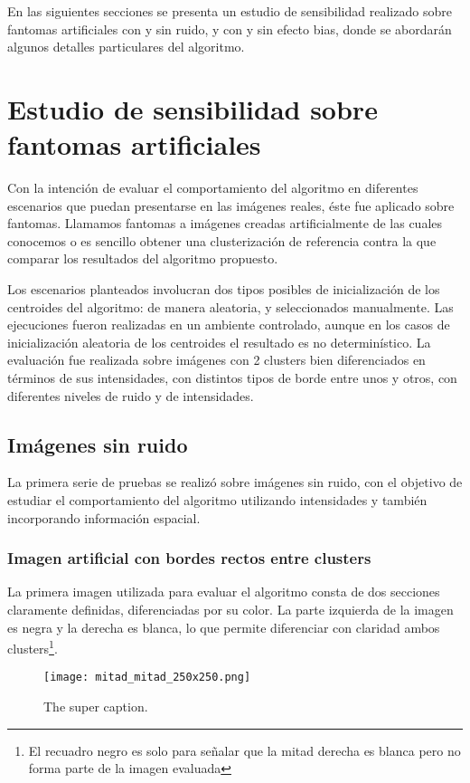 En las siguientes secciones se presenta un estudio de sensibilidad realizado sobre fantomas artificiales con y sin ruido, y con y sin efecto bias, donde se abordarán algunos detalles particulares del algoritmo.

\section{Estudio de sensibilidad sobre fantomas artificiales}
Con la intención de evaluar el comportamiento del algoritmo en diferentes escenarios que puedan presentarse en las imágenes reales, éste fue aplicado sobre fantomas. Llamamos fantomas a imágenes creadas artificialmente de las cuales conocemos o es sencillo obtener una clusterización de referencia contra la que comparar los resultados del algoritmo propuesto.

Los escenarios planteados involucran dos tipos posibles de inicialización de los centroides del algoritmo: de manera aleatoria, y seleccionados manualmente. Las ejecuciones fueron realizadas en un ambiente controlado, aunque en los casos de inicialización aleatoria de los centroides el resultado es no determinístico. La evaluación fue realizada sobre imágenes con 2 clusters bien diferenciados en términos de sus intensidades, con distintos tipos de borde entre unos y otros, con diferentes niveles de ruido y de intensidades.

\subsection{Imágenes sin ruido}
La primera serie de pruebas se realizó sobre imágenes sin ruido, con el objetivo de estudiar el comportamiento del algoritmo utilizando intensidades y también incorporando información espacial.

\subsubsection{Imagen artificial con bordes rectos entre clusters}
La primera imagen utilizada para evaluar el algoritmo consta de dos secciones claramente definidas, diferenciadas por su color. La parte izquierda de la imagen es negra y la derecha es blanca, lo que permite diferenciar con claridad ambos clusters\footnote{El recuadro negro es solo para señalar que la mitad derecha es blanca pero no forma parte de la imagen evaluada}.

\begin{figure}[h]
\centering
	\texttt{[image: mitad\_mitad\_250x250.png]}
	\caption[The super caption]{The super caption.}
\end{figure}

